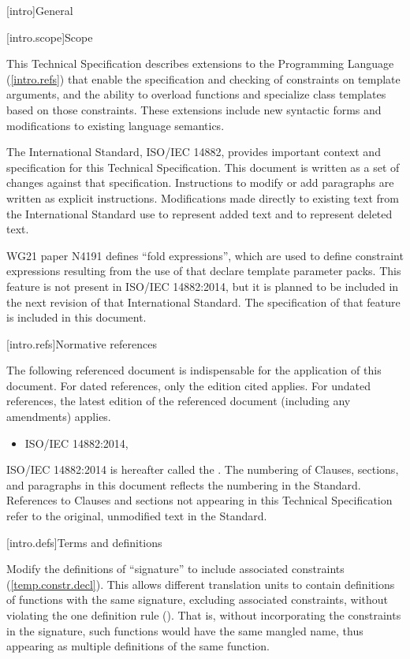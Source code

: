 
[intro]{General}

[intro.scope]{Scope}

\pnum
This Technical Specification describes extensions to the \Cpp
Programming Language (\ref{intro.refs}) that
enable the specification and checking of constraints on template 
arguments, and the ability to overload functions and specialize
class templates based on those constraints. These extensions include 
new syntactic forms and modifications to existing language semantics.

\pnum
The International Standard, ISO/IEC 14882, provides important context
and specification for this Technical Specification. This document is 
written as a set of changes against that specification. Instructions
to modify or add paragraphs are written as explicit instructions. 
Modifications made directly to existing text from the International
Standard use  to represent added text and
 to represent deleted text.

\pnum
WG21 paper N4191 defines ``fold expressions'', which are used to define 
constraint expressions resulting from the use of 
 that declare template parameter
packs. This feature is not present in ISO/IEC 14882:2014, but it is planned 
to be included in the next revision of that International Standard. The
specification of that feature is included in this document.


[intro.refs]{Normative references}

\pnum
The following referenced document is indispensable for the
application of this document. For dated references, only the
edition cited applies. For undated references, the latest edition
of the referenced document (including any amendments) applies.

\begin{itemize}
\item ISO/IEC 14882:2014, 
\end{itemize}

ISO/IEC 14882:2014 is hereafter called the .
%
The numbering of Clauses, sections, and paragraphs in this document
reflects the numbering in the \Cpp Standard. References to Clauses
and sections not appearing in this Technical Specification refer to
the original, unmodified text in the \Cpp Standard.

[intro.defs]{Terms and definitions}

Modify the definitions of ``signature'' to include associated
constraints (\ref{temp.constr.decl}). This allows different translation units
to contain definitions of functions with the same signature, excluding 
associated constraints, without violating the one definition rule 
(). That is, without incorporating the constraints
in the signature, such functions would have the same mangled name, thus
appearing as multiple definitions of the same function.

